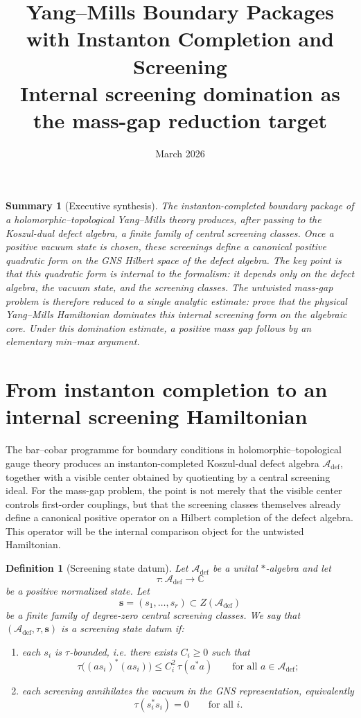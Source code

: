 \documentclass[11pt]{article}
\title{Yang--Mills Boundary Packages with Instanton Completion and Screening\\
\large Internal screening domination as the mass-gap reduction target}
\author{}
\date{March 2026}
\theoremstyle{plainstyle}
\theoremstyle{defstyle}
\newtheorem{definition}[theorem]{Definition}
\newtheorem{summary}[theorem]{Summary}
\newcommand{\A}{\mathcal{A}}
\newcommand{\C}{\mathbb{C}}
\begin{document}
\maketitle

\begin{summary}[Executive synthesis]
The instanton-completed boundary package of a holomorphic--topological Yang--Mills theory
produces, after passing to the Koszul-dual defect algebra, a finite family of central screening classes.
Once a positive vacuum state is chosen, these screenings define a canonical positive quadratic form on the
GNS Hilbert space of the defect algebra.  The key point is that this quadratic form is \emph{internal} to the
formalism: it depends only on the defect algebra, the vacuum state, and the screening classes.
The untwisted mass-gap problem is therefore reduced to a single analytic estimate: prove that the physical
Yang--Mills Hamiltonian dominates this internal screening form on the algebraic core.
Under this domination estimate, a positive mass gap follows by an elementary min--max argument.
\end{summary}

\section{From instanton completion to an internal screening Hamiltonian}

The bar--cobar programme for boundary conditions in holomorphic--topological gauge theory
produces an instanton-completed Koszul-dual defect algebra $\A_{\mathrm{def}}$, together with a visible center
obtained by quotienting by a central screening ideal.
For the mass-gap problem, the point is not merely that the visible center controls first-order couplings,
but that the screening classes themselves already define a canonical positive operator on a Hilbert completion
of the defect algebra.
This operator will be the internal comparison object for the untwisted Hamiltonian.

\begin{definition}[Screening state datum]
Let $\A_{\mathrm{def}}$ be a unital $*$-algebra and let
\[
\tau\colon \A_{\mathrm{def}}\longrightarrow \C
\]
be a positive normalized state.  Let
\[
\mathbf s=(s_1,\dots,s_r)\subset Z(\A_{\mathrm{def}})
\]
be a finite family of degree-zero central screening classes.  We say that
$(\A_{\mathrm{def}},\tau,\mathbf s)$ is a \emph{screening state datum} if:
\begin{enumerate}[label=(\roman*)]
\item each $s_i$ is \emph{$\tau$-bounded}, i.e. there exists $C_i\ge 0$ such that
\[
\tau\bigl((a s_i)^*(a s_i)\bigr)\le C_i^2\,\tau(a^*a)
\qquad\text{for all }a\in \A_{\mathrm{def}};
\]
\item each screening annihilates the vacuum in the GNS representation, equivalently
\[
\tau(s_i^*s_i)=0
\qquad\text{for all }i.
\]
\end{enumerate}
\end{definition}
\end{document}
